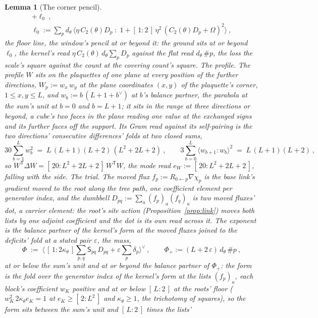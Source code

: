 \documentclass[11pt]{article}
\newtheorem{lemma}{Lemma}
\theoremstyle{definition}
\begin{document}
\begin{lemma}[The corner pencil]
\begin{gather*}
+\ell_0\ ,\\
\ell_0:=\sum_pd_\theta\,\Big\langle\eta\,C_2(\theta)D_p\;:\;
1+[\,1:2\,]\,\eta^{2}\,(C_2(\theta)D_p+\Omega)^{2}\Big\rangle\ ,
\end{gather*}
the \emph{floor line}, the window's pencil at or beyond it: the
ground sits at or beyond $\ell_0$, the kernel's read
$\eta\,C_2(\theta)\,d_\theta\sum_pD_p$ against the flat read
$d_\theta\,\#p$, the loss the scale's square against the count at
the covering count's square. \emph{The profile.} The \emph{profile} $W$ sits on the
plaquettes of one plane at every position of the further
directions, $W_p:=w_x\,w_y$ at the plane coordinates $(x,y)$ of the
plaquette's corner, $1\le x,y\le L$, and $w_b:=b\,(L+1+b^{\vee})$
at $b$'s balance partner, the parabola at the sum's unit at
$b=0$ and $b=L+1$; it sits in the range at three directions or
beyond, a cube's two faces in the plane reading one value at the
exchanged signs and its further faces off the support. Its Gram read
against its self-pairing is the two directions' consecutive
differences' folds at two closed sums,
\[
30\sum_{b=1}^{L}w_b^{2}\;=\;L\,(L+1)(L+2)\,(L^{2}+2L+2)\ ,
\qquad
3\sum_{b=0}^{L}\big\langle w_{b+1}\!:\!w_b\big\rangle^{2}
\;=\;L\,(L+1)(L+2)\ ,
\]
so $W^{\mathsf T}\Delta W=[\,20:L^{2}+2L+2\,]\,W^{\mathsf T}W$, the
\emph{mode read} $e_W:=[\,20:L^{2}+2L+2\,]$, falling with the side.
\emph{The trial.} The \emph{moved flux} $f_p:=R_{0\leftarrow p}
\nabla\chi_p$ is the base link's gradient moved to the root along
the tree path, one coefficient element per generator index, and
the \emph{dumbbell} $D_{pq}:=\sum_a(f_p)_a(f_q)_a$ is two moved
fluxes' dot, a carrier element: the root's site action
(Proposition~\ref{prop:link}) moves both lists by one adjoint
coefficient and the dot is its own read across it. The
\emph{exponent} is the balance partner of the kernel's form at the
moved fluxes joined to the deficits' fold at a stated pair
$\varepsilon$, the \emph{mass},
\[
\Phi\;:=\;\Big\langle\,[\,1:2\kappa_\theta\,]\sum_{p,q}
\mathsf S_{pq}\,D_{pq}+\varepsilon\sum_p\delta_p\Big\rangle^{\!\vee}\ ,
\qquad
\Phi_+:=(L+2\,\varepsilon)\,d_\theta\,\#p\ ,
\]
at or below the sum's unit and at or beyond the
balance partner of $\Phi_+$: the form is the fold over the generator index of the
kernel's form at the lists $(f_p)_a$, each block's coefficient
$w_K$ positive and at or below $[\,L:2\,]$ at the roots' floor
($w_K^{2}\,2\kappa_\theta e_K=1$ at $e_K\ge[\,2:L^{2}\,]$ and
$\kappa_\theta\ge1$, the trichotomy of squares), so the form sits
between the sum's unit and $[\,L:2\,]$ times the lists'

\end{lemma}
\end{document}
